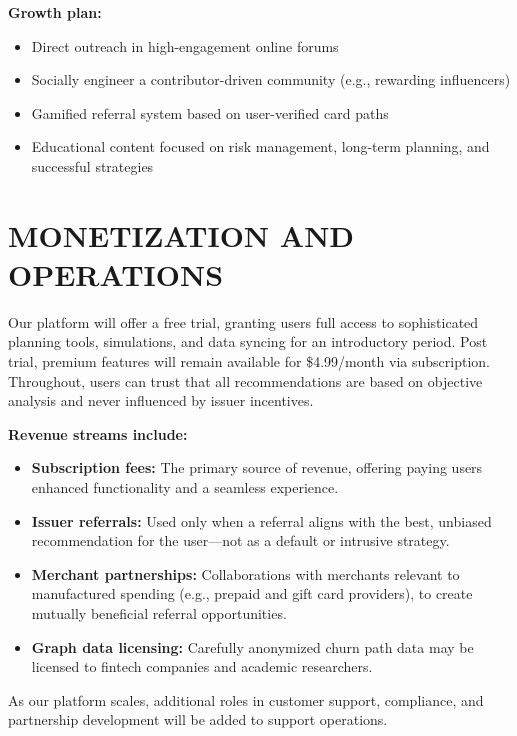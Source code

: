 \textbf{Growth plan:}
\vspace{-0.5em}
\begin{itemize}[noitemsep]
\item Direct outreach in high-engagement online forums
\item Socially engineer a contributor-driven community (e.g., rewarding influencers)
\item Gamified referral system based on user-verified card paths
\item Educational content focused on risk management, long-term planning, and successful strategies
\end{itemize}

\section{MONETIZATION AND OPERATIONS}
Our platform will offer a free trial, granting users full access to sophisticated planning tools, simulations, and data syncing for an introductory period. Post trial, premium features will remain available for \$4.99/month via subscription. Throughout, users can trust that all recommendations are based on objective analysis and never influenced by issuer incentives.

\textbf{Revenue streams include:}
\vspace{-0.5em}
\begin{itemize}[noitemsep]
\item \textbf{Subscription fees:} The primary source of revenue, offering paying users enhanced functionality and a seamless experience.
\item \textbf{Issuer referrals:} Used only when a referral aligns with the best, unbiased recommendation for the user—not as a default or intrusive strategy.
\item \textbf{Merchant partnerships:} Collaborations with merchants relevant to manufactured spending (e.g., prepaid and gift card providers), to create mutually beneficial referral opportunities.
\item \textbf{Graph data licensing:} Carefully anonymized churn path data may be licensed to fintech companies and academic researchers.
\end{itemize}

As our platform scales, additional roles in customer support, compliance, and partnership development will be added to support operations. 

